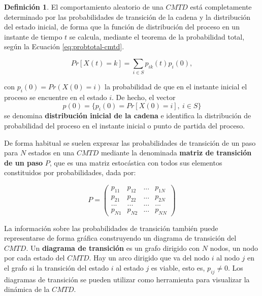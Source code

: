 \documentclass[
]{book}
\newenvironment{yellowbox}{
  \definecolor{shadecolor}{rgb}{210, 180, 140}  
  \color{black}
  \begin{shaded}}
 {\end{shaded}}
\theoremstyle{definition}
\newtheorem{definition}{Definición}[chapter]
\theoremstyle{definition}
\theoremstyle{definition}
\theoremstyle{definition}
\theoremstyle{remark}
\begin{document}
\begin{yellowbox}

\begin{definition}
\protect\hypertarget{def:distriproceso}{}\label{def:distriproceso}El comportamiento aleatorio de una \(CMTD\) está completamente determinado por las probabilidades de transición de la cadena y la distribución del estado inicial, de forma que la función de distribución del proceso en un instante de tiempo \(t\) se calcula, mediante el teorema de la probabilidad total, según la Ecuación \eqref{eq:probtotal-cmtd}.

\begin{equation}
Pr[X(t)= k] =  \sum_{i \in S} p_{ik}(t) p_i(0),
\label{eq:probtotal-cmtd}
\end{equation}

con \(p_i(0) = Pr(X(0) = i)\) la probabilidad de que en el instante inicial el proceso se encuentre en el estado \(i\). De hecho, el vector \[p(0) = \{p_i(0)= Pr[X(0) = i], \ i \in S\}\] se denomina \textbf{distribución inicial de la cadena} e identifica la distribución de probabilidad del proceso en el instante inicial o punto de partida del proceso.
\end{definition}

\end{yellowbox}

De forma habitual se suelen expresar las probabilidades de transición de un paso para \(N\) estados en una \(CMTD\) mediante la denominada \textbf{matriz de transición de un paso} \(P\), que es una matriz estocástica con todos sus elementos constituidos por probabilidades, dada por:

\[P = 
\begin{pmatrix}
p_{11} & p_{12} & ... & p_{1N}\\
p_{21} & p_{22} & ... & p_{2N}\\
... & ... & ... & ...\\
p_{N1} & p_{N2} & ... & p_{NN}
\end{pmatrix}\]

La información sobre las probabilidades de transición también puede representarse de forma gráfica construyendo un diagrama de transición del \(CMTD\). Un \textbf{diagrama de transición} es un grafo dirigido con \(N\) nodos, un nodo por cada estado del \(CMTD\). Hay un arco dirigido que va del nodo \(i\) al nodo \(j\) en el grafo si la transición del estado \(i\) al estado \(j\) es viable, esto es, \(p_{ij} \neq 0\). Los diagramas de transición se pueden utilizar como herramienta para visualizar la dinámica de la \(CMTD\).
\end{document}
